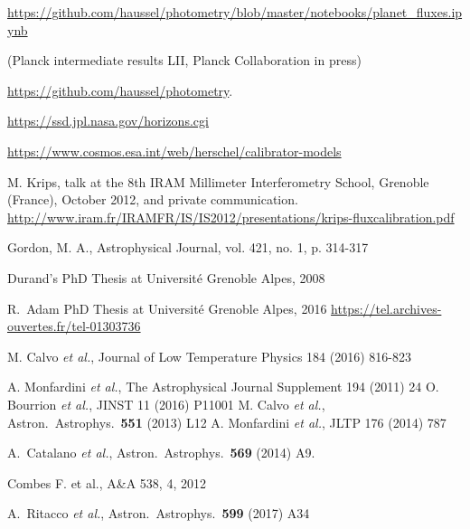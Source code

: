 \begin{thebibliography}{99}
\url{https://github.com/haussel/photometry/blob/master/notebooks/planet_fluxes.ipynb}

(Planck intermediate results LII, Planck
Collaboration in press)

\url{https://github.com/haussel/photometry}.

\url{https://ssd.jpl.nasa.gov/horizons.cgi}

\url{https://www.cosmos.esa.int/web/herschel/calibrator-models}

 M. Krips, talk at the 8th 
IRAM Millimeter Interferometry School, Grenoble (France),  October 2012, and
private communication.\\
\url{http://www.iram.fr/IRAMFR/IS/IS2012/presentations/krips-fluxcalibration.pdf}

 Gordon, M. A., Astrophysical Journal, vol. 421, no. 1, p. 314-317

 Durand's PhD Thesis at
Universit\'e Grenoble Alpes, 2008

 R.~Adam PhD Thesis at
  Universit\'e Grenoble Alpes, 2016
\url{https://tel.archives-ouvertes.fr/tel-01303736}

M. Calvo {\it et al.},  
Journal of Low Temperature Physics 184 (2016) 816-823 
 
    A. Monfardini {\it et al.}, The Astrophysical Journal Supplement 194 (2011)  24 
    O. Bourrion {\it et al.}, JINST 11 (2016) P11001 
    M. Calvo {\it et al.}, Astron.\ Astrophys.\  {\bf 551} (2013) L12
 A. Monfardini {\it et al.}, JLTP 176 (2014) 787
    
 
  A.~Catalano {\it et al.},
  Astron.\ Astrophys.\  {\bf 569} (2014) A9.
  
 Combes F. et al., A\&A 538, 4, 2012
  
 
  A.~Ritacco {\it et al.},
  Astron.\ Astrophys.\  {\bf 599} (2017) A34
  

\end{thebibliography}
